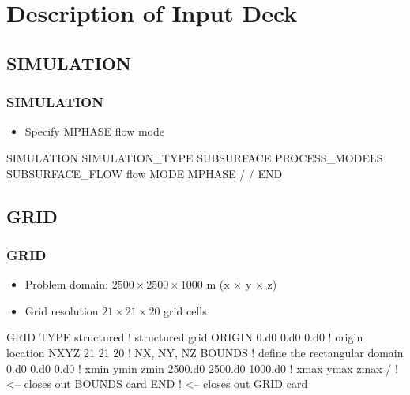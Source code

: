 \documentclass{beamer}
\newcommand\bluecomment[1]{{{\color{blue} #1}}}
\begin{document}
\section{Description of Input Deck}

\subsection{SIMULATION}

\begin{frame}[fragile]\frametitle{SIMULATION}

\begin{itemize}
\item Specify MPHASE flow mode
\end{itemize}


\begin{semiverbatim}

SIMULATION
  SIMULATION_TYPE SUBSURFACE
  PROCESS_MODELS
    SUBSURFACE_FLOW flow
      MODE MPHASE
    /
  /
END
\end{semiverbatim}

\end{frame}

\subsection{GRID}
\begin{frame}\frametitle{GRID}

\begin{itemize}
  \item Problem domain: $2500 \times 2500 \times 1000$ m (x $\times$ y $\times$ z)
  \item Grid resolution $21 \times 21 \times 20$ grid cells
\end{itemize}

\begin{semiverbatim}
GRID
  TYPE structured        \bluecomment{! structured grid}
  ORIGIN 0.d0 0.d0 0.d0  \bluecomment{! origin location}
  NXYZ 21 21 20          \bluecomment{! NX, NY, NZ}
  BOUNDS             \bluecomment{! define the rectangular domain}
    0.d0 0.d0 0.d0   \bluecomment{! xmin ymin zmin}
    2500.d0 2500.d0 1000.d0  \bluecomment{! xmax ymax zmax}
  /  \bluecomment{! <-- closes out BOUNDS card}
END  \bluecomment{! <-- closes out GRID card}
\end{semiverbatim}

\end{frame}
\end{document}
